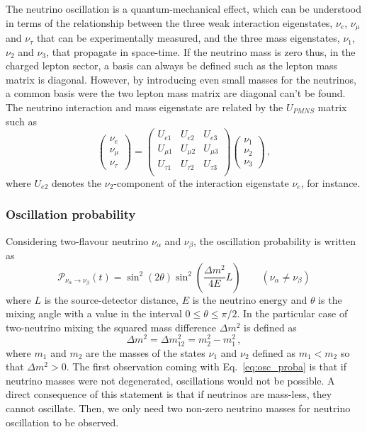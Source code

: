 The neutrino oscillation is a quantum-mechanical effect, which can be understood in terms of the relationship between the three weak interaction eigenstates, $\nu_e$, $\nu_{\mu}$ and $\nu_{\tau}$ that can be experimentally measured, and the three mass eigenstates, $\nu_1$, $\nu_2$ and $\nu_3$, that propagate in space-time.
If the neutrino mass is zero thus, in the charged lepton sector, a basis can always be defined such as the lepton mass matrix is diagonal.
However, by introducing even small masses for the neutrinos, a common basis were the two lepton mass matrix are diagonal can't be found.
The neutrino interaction and mass eigenstate are related by the $U_{PMNS}$ matrix such as
\begin{equation}
  \begin{pmatrix}
    \nu_e \\
    \nu_{\mu} \\
    \nu_{\tau}
  \end{pmatrix}
  =
  \begin{pmatrix}
    U_{e1} & U_{e2} & U_{e3} \\
    U_{\mu 1} & U_{\mu 2} & U_{\mu 3} \\
    U_{\tau 1} &  U_{\tau 2} &  U_{\tau 3} \\
  \end{pmatrix}
  \begin{pmatrix}
    \nu_1 \\
    \nu_2 \\
    \nu_3
  \end{pmatrix}
  \,,
  \label{eq:upmns}
\end{equation}
where $U_{e2}$ denotes the $\nu_2$-component of the interaction eigenstate $\nu_e$, for instance.

\subsubsection*{Oscillation probability}

Considering two-flavour neutrino $\nu_{\alpha}$ and $\nu_{\beta}$, the oscillation probability is written as
\begin{equation}
  \mathcal{P}_{\nu_{\alpha}\rightarrow \nu_{\beta}}(t)=\sin^{2}({2\theta})\sin^{2}\left({\frac{\Delta m^2}{4E}}L\right)\qquad (\nu_{\alpha}\neq\nu_{\beta})
  \label{eq:osc_proba}
\end{equation}
where $L$ is the source-detector distance, $E$ is the neutrino energy and $\theta$ is the mixing angle with a value in the interval ${0\leq\theta\leq\pi/2}$.
In the particular case of two-neutrino mixing the squared mass difference $\Delta m^2$ is defined as
\begin{equation}
\Delta m^2=\Delta m_{12}^2=m_2^2-m_1^2\,,
\end{equation}
where $m_1$ and $m_2$ are the masses of the states $\nu_1$ and $\nu_2$ defined as $m_1<m_2$ so that $\Delta m^2>0$.
The first observation coming with Eq.~\eqref{eq:osc_proba} is that if neutrino masses were not degenerated, oscillations would not be possible.
A direct consequence of this statement is that if neutrinos are mass-less, they cannot oscillate.
Then, we only need two non-zero neutrino masses for neutrino oscillation to be observed.


